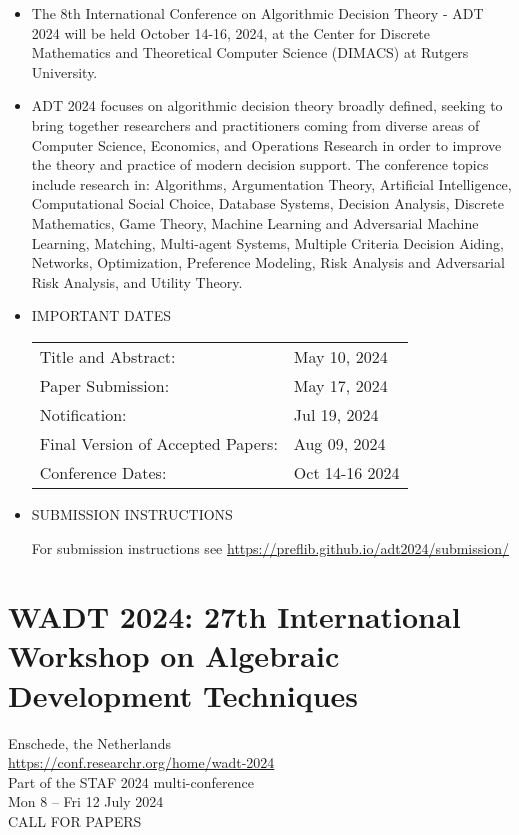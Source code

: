 \documentclass[prodmode,acmtecs]{acmsmall} %
\begin{document}
\begin{itemize}\item  The 8th International Conference on Algorithmic Decision Theory - ADT 2024 will be held October 14-16, 2024, at the Center for Discrete Mathematics and Theoretical Computer Science (DIMACS) at Rutgers University. 
 
\item  ADT 2024 focuses on algorithmic decision theory broadly defined, seeking to bring together researchers and practitioners coming from diverse areas of Computer Science, Economics, and Operations Research in order to improve the theory and practice of modern decision support. The conference topics include research in: Algorithms, Argumentation Theory, Artificial Intelligence, Computational Social Choice, Database Systems, Decision Analysis, Discrete Mathematics, Game Theory, Machine Learning and Adversarial Machine Learning, Matching, Multi-agent Systems, Multiple Criteria Decision Aiding, Networks, Optimization, Preference Modeling, Risk Analysis and Adversarial Risk Analysis, and Utility Theory. 
 
\item  IMPORTANT DATES 
 
\begin{tabulary}{\linewidth}{LL}Title and Abstract:  & May 10, 2024 \\
Paper Submission:  & May 17, 2024 \\
Notification:  & Jul 19, 2024 \\
Final Version of Accepted Papers:  & Aug 09, 2024 \\
Conference Dates:  & Oct 14-16 2024 \\
\end{tabulary}
 
\item  SUBMISSION INSTRUCTIONS 
 
  For submission instructions see \href{https://preflib.github.io/adt2024/submission/}{https://preflib.github.io/adt2024/submission/} 
 
\end{itemize}\section{WADT 2024: 27th International Workshop on Algebraic Development Techniques}\label{WADT2024}  Enschede, the Netherlands\\ 
  \href{https://conf.researchr.org/home/wadt-2024}{https://conf.researchr.org/home/wadt-2024}\\ 
  Part of the STAF 2024 multi-conference\\ 
  Mon 8 – Fri 12 July 2024\\ 
CALL FOR PAPERS 
\end{document}
